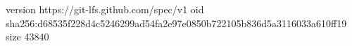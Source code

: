 version https://git-lfs.github.com/spec/v1
oid sha256:d68535f228d4c5246299ad54fa2e97e0850b722105b836d5a3116033a610ff19
size 43840
